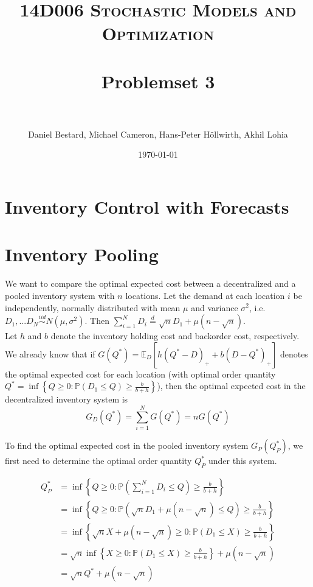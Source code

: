 \documentclass[11pt, oneside]{article}   	%
\title{
\normalfont \normalsize
\textsc{14D006 Stochastic Models and Optimization} \\ [25pt] %
\horrule{0.5pt} \\[0.4cm] %
\huge Problemset 3\\ %
\horrule{2pt} \\[0.5cm] %
}
\author{Daniel Bestard, Michael Cameron, Hans-Peter H{\"o}llwirth, Akhil Lohia} %
\date{\normalsize\today} %
\begin{document}
\maketitle


\section{Inventory Control with Forecasts}


\section{Inventory Pooling}
We want to compare the optimal expected cost between a decentralized and a pooled inventory system with $n$ locations. Let the demand at each location $i$ be independently, normally distributed with mean $\mu$ and variance $\sigma^2$, i.e. $D_1,...D_N \stackrel{iid}{\sim} N(\mu, \sigma^2)$. Then $\sum_{i=1}^N D_i \stackrel{d}{=} \sqrt{n}D_1 + \mu (n-\sqrt{n})$. \\


Let $h$ and $b$ denote the inventory holding cost and backorder cost, respectively. We already know that if $G(Q^*) = \mathbb{E}_D[h(Q^*-D)_+ + b(D-Q^*)_+]$ denotes the optimal expected cost for each location (with optimal order quantity $Q^* = \inf \left\{ Q \geq 0: \mathbb{P}\left(D_1 \leq Q \right) \geq \frac{b}{b+h} \right\}$), then the optimal expected cost in the decentralized inventory system is
$$G_D(Q^*) = \sum_{i=1}^N G(Q^*) = n G(Q^*)$$

To find the optimal expected cost in the pooled inventory system $G_P(Q_P^*)$, we first need to determine the optimal order quantity $Q_P^*$ under this system. 

\begin{align*}
Q_P^* &=  \inf \left\{ Q \geq 0: \mathbb{P}\left( \sum_{i=1}^N D_i \leq Q \right) \geq \frac{b}{b+h} \right\}\\
&=  \inf \left\{ Q \geq 0: \mathbb{P}\left( \sqrt{n}D_1 + \mu (n-\sqrt{n}) \leq Q \right) \geq \frac{b}{b+h} \right\}\\
&=  \inf \left\{ \sqrt{n}X + \mu (n-\sqrt{n}) \geq 0: \mathbb{P}\left(D_1 \leq X \right) \geq \frac{b}{b+h} \right\}\\
&=  \sqrt{n} \inf \left\{ X \geq 0: \mathbb{P}\left(D_1 \leq X \right) \geq \frac{b}{b+h} \right\} + \mu (n-\sqrt{n})\\
&=  \sqrt{n} Q^* + \mu (n-\sqrt{n})\\
\end{align*}
\end{document}
